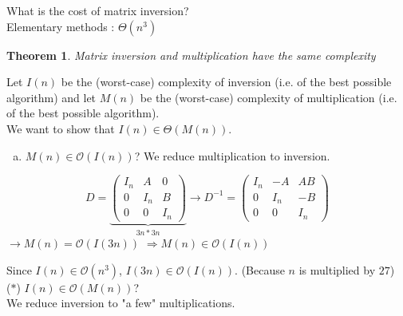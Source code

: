 \documentclass[12pt,a4paper]{report}
\theoremstyle{break}
\newtheorem{theorem}{Theorem}
\newenvironment{proof}[1][Proof]{\begin{trivlist}
\item[\hskip \labelsep {\bfseries #1}]}{\end{trivlist}}
\begin{document}
What is the cost of matrix inversion?\\
Elementary methods : $\Theta(n^3)$
\begin{theorem}
Matrix inversion and multiplication have the same complexity
\end{theorem}
\begin{proof}
Let $I(n)$ be the (worst-case) complexity of inversion (i.e. of the best possible algorithm) and let $M(n)$ be the (worst-case) complexity of multiplication (i.e. of the best possible algorithm).\\
We want to show that $I(n)\in \Theta(M(n))$.
\begin{enumerate}[a)]
\item $M(n)\in \mathcal{O}(I(n))$? We reduce multiplication to inversion.\\
\end{enumerate}
$$D=\underbrace{\begin{pmatrix}
I_n & A & 0\\
0 & I_n & B\\
0 & 0 & I_n
\end{pmatrix}}\limits_{3n*3n}
\rightarrow D^{-1}=\begin{pmatrix}
I_n & -A & AB\\
0 & I_n & -B\\
0 & 0 & I_n
\end{pmatrix} $$
\hspace*{2cm}$\rightarrow M(n)=\mathcal{O}(I(3n))$ \hspace*{4cm} $\Rightarrow M(n) \in \mathcal{O}(I(n))$
\end{proof}
Since $I(n) \in \mathcal{O}(n^3)$, $I(3n)\in \mathcal{O}(I(n))$. (Because $n$ is multiplied by $27$)\\

($\ast$)  $I(n)\in \mathcal{O}(M(n))$?\\

We reduce inversion to "a few" multiplications.\\
\end{document}
